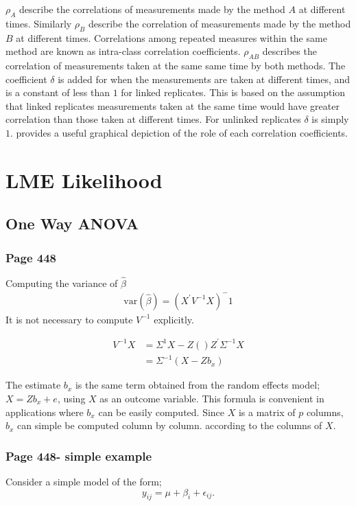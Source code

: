 \documentclass[12pt, a4paper]{report}
\theoremstyle{plain}
\theoremstyle{definition}
\theoremstyle{remark}
\begin{document}
	$\rho_{A}$ describe the correlations of measurements made by the method $A$ at different times. Similarly $\rho_{B}$ describe the correlation of measurements made by the method $B$ at different times. Correlations among repeated measures within the same method are known as intra-class correlation coefficients. $\rho_{AB}$ describes the correlation of measurements taken at the same same time by both methods. The coefficient $\delta$ is added for when the measurements are taken at different times, and is a constant of less than $1$ for linked replicates. This is based on the assumption that linked replicates measurements taken at the same time would have greater correlation than those taken at different times. For unlinked replicates $\delta$ is simply $1$. \citet{hamlett} provides a useful graphical depiction of the role of each correlation coefficients.
	
	
	
	
	
	
	
	
	
	
	\chapter{LME Likelihood}
	\section{One Way ANOVA}
	\subsection{Page 448}
	Computing the variance of $\hat{\beta}$
	\begin{eqnarray}
	\mbox{var}(\hat{\beta}) = (X^{\prime}V^{-1}X)^-1
	\end{eqnarray}
	It is not necessary to compute $V^{-1}$ explicitly.
	
	\begin{eqnarray}
	V^{-1}X &= \Sigma^{1}{X-Z()Z^{\prime}\Sigma^{-1}X} \\
	&= \Sigma^{-1}(X-Zb_{x})
	\end{eqnarray}
	
	The estimate $b_{x}$ is the same term obtained from the random effects model; $X = Zb_{x} + e$, using $X$ as an outcome variable.
	This formula is convenient in applications where $b_{x}$ can be easily computed. Since $X$ is a matrix of $p$ columns, $b_{x}$ can simple be computed column by column. according to the columns of $X$.
	\subsection{Page 448- simple example}
	Consider a simple model of the form;
	\begin{equation*}
	y_{ij} = \mu + \beta_{i} + \epsilon_{ij}.
	\end{equation*}
	
\end{document}
